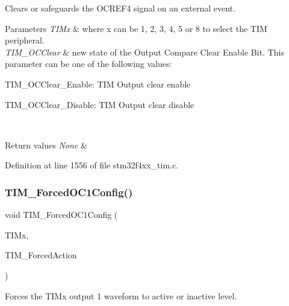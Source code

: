 Clears or safeguards the O\+C\+R\+E\+F4 signal on an external event. 


\begin{DoxyParams}{Parameters}
{\em T\+I\+Mx} & where x can be 1, 2, 3, 4, 5 or 8 to select the T\+IM peripheral. \\
\hline
{\em T\+I\+M\+\_\+\+O\+C\+Clear} & new state of the Output Compare Clear Enable Bit. This parameter can be one of the following values\+: \begin{DoxyItemize}
\item T\+I\+M\+\_\+\+O\+C\+Clear\+\_\+\+Enable\+: T\+IM Output clear enable \item T\+I\+M\+\_\+\+O\+C\+Clear\+\_\+\+Disable\+: T\+IM Output clear disable \end{DoxyItemize}
\\
\hline
\end{DoxyParams}

\begin{DoxyRetVals}{Return values}
{\em None} & \\
\hline
\end{DoxyRetVals}


Definition at line 1556 of file stm32f4xx\+\_\+tim.\+c.

\mbox{\label{group___t_i_m___group2_ga4f58c12e6493a0d8b9555c9097b831d6}} 
\subsubsection{\texorpdfstring{T\+I\+M\+\_\+\+Forced\+O\+C1\+Config()}{TIM\_ForcedOC1Config()}}
{\footnotesize\ttfamily void T\+I\+M\+\_\+\+Forced\+O\+C1\+Config (\begin{DoxyParamCaption}\item[{\hyperlink{struct_t_i_m___type_def}{T\+I\+M\+\_\+\+Type\+Def} $\ast$}]{T\+I\+Mx,  }\item[{uint16\+\_\+t}]{T\+I\+M\+\_\+\+Forced\+Action }\end{DoxyParamCaption})}



Forces the T\+I\+Mx output 1 waveform to active or inactive level. 


